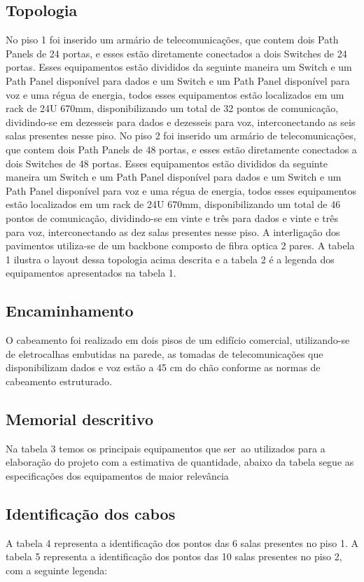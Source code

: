 \documentclass[	DIV=calc,%
							paper=a4,%
							fontsize=12pt,%
							onecolumn]{scrartcl}	 					%
\begin{document}
\subsection{Topologia}
No piso 1 foi inserido um armário de telecomunicações, que contem dois Path Panels
de 24 portas, e esses estão diretamente conectados a dois Switches de 24 portas. Esses
equipamentos estão divididos da seguinte maneira um Switch e um Path Panel disponível
para dados e um Switch e um Path Panel disponível para voz e uma régua de energia, todos
esses equipamentos estão localizados em um rack de 24U 670mm, disponibilizando um
total de 32 pontos de comunicação, dividindo-se em dezesseis para dados e dezesseis para
voz, interconectando as seis salas presentes nesse piso. No piso 2 foi inserido um armário
de telecomunicações, que contem dois Path Panels de 48 portas, e esses estão diretamente
conectados a dois Switches de 48 portas. Esses equipamentos estão divididos da seguinte
maneira um Switch e um Path Panel disponível para dados e um Switch e um Path Panel
disponível para voz e uma régua de energia, todos esses equipamentos estão localizados
em um rack de 24U 670mm, disponibilizando um total de 46 pontos de comunicação,
dividindo-se em vinte e três para dados e vinte e três para voz, interconectando as dez salas
presentes nesse piso. A interligação dos pavimentos utiliza-se de um backbone composto
de fibra optica 2 pares. A tabela 1 ilustra o layout dessa topologia acima descrita e a
tabela 2 é a legenda dos equipamentos apresentados na tabela 1.

\subsection{Encaminhamento}
O cabeamento foi realizado em dois pisos de um edifício comercial, utilizando-se de
eletrocalhas embutidas na parede, as tomadas de telecomunicações que disponibilizam
dados e voz estão a 45 cm do chão conforme as normas de cabeamento estruturado.
\subsection{Memorial descritivo}

Na tabela 3 temos os principais equipamentos que ser~ao utilizados para a elaboração do
projeto com a estimativa de quantidade, abaixo da tabela segue as especificações dos equipamentos de maior relevância 
\subsection{Identificação dos cabos}
A tabela 4 representa a identificação dos pontos das 6 salas presentes no piso 1. A tabela
5 representa a identificação dos pontos das 10 salas presentes no piso 2, com a seguinte
legenda:
\end{document}
